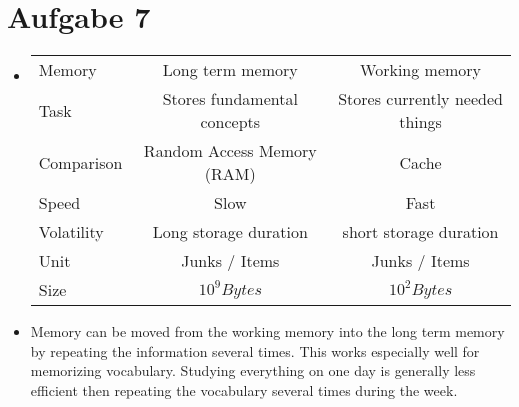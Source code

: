 \documentclass{article}
\begin{document}
\section*{Aufgabe 7}
\begin{itemize}
    \item 
\begin{table}[H]
    \centering
    \begin{tabular}{lcc}
	\toprule
	Memory & Long term memory & Working memory \\
	Task & Stores fundamental concepts & Stores currently needed things \\ \midrule
	Comparison & Random Access Memory (RAM) & Cache \\
	Speed & Slow & Fast \\
	Volatility & Long storage duration & short storage duration \\
	Unit & Junks / Items & Junks / Items \\
	Size & \( 10 ^{9} Bytes\) & \( 10 ^{2} Bytes \) \\
	\bottomrule
    \end{tabular}
\end{table}
\item Memory can be moved from the working memory into the long term memory by
    repeating the information several times. This works especially well for
    memorizing vocabulary. Studying everything on one day is generally less efficient
    then repeating the vocabulary several times during the week.
\end{itemize}
\end{document}
